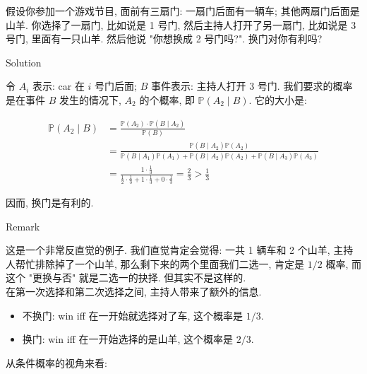 \documentclass{qlnotes-export}
\begin{document}
\begin{example}\label{ex-01-combinatorics-prob-space-monty-hall-problem}

假设你参加一个游戏节目, 面前有三扇门: 一扇门后面有一辆车; 其他两扇门后面是山羊. 你选择了一扇门, 比如说是 1 号门, 然后主持人打开了另一扇门, 比如说是 3 号门, 里面有一只山羊. 然后他说 "你想换成 2 号门吗?". 换门对你有利吗?

\begin{qlsolution}{Solution}

令 \(A_{i}\) 表示: car 在 \(i\) 号门后面; \(B\) 事件表示: 主持人打开 3 号门. 我们要求的概率是在事件 \(B\) 发生的情况下, \(A_{2}\) 的个概率, 即 \({\mathbb{P}}(A_{2} \mid B)\). 它的大小是:

\[\begin{matrix}
{{\mathbb{P}}(A_{2} \mid B)} & {= \frac{{\mathbb{P}}(A_{2}) \cdot {\mathbb{P}}(B \mid A_{2})}{{\mathbb{P}}(B)}} \\
 & {= \frac{{\mathbb{P}}(B \mid A_{2}){\mathbb{P}}(A_{2})}{{\mathbb{P}}(B \mid A_{1}){\mathbb{P}}(A_{1}) + {\mathbb{P}}(B \mid A_{2}){\mathbb{P}}(A_{2}) + {\mathbb{P}}(B \mid A_{3}){\mathbb{P}}(A_{3})}} \\
 & {= \frac{1 \cdot \frac{1}{3}}{\frac{1}{2} \cdot \frac{1}{3} + 1 \cdot \frac{1}{3} + 0 \cdot \frac{1}{3}} = \frac{2}{3} > \frac{1}{3}}
\end{matrix}\]

因而, 换门是有利的.

\end{qlsolution}

\begin{qlremark}{Remark}

这是一个非常反直觉的例子. 我们直觉肯定会觉得: 一共 1 辆车和 2 个山羊, 主持人帮忙排除掉了一个山羊, 那么剩下来的两个里面我们二选一, 肯定是 \(1/2\) 概率, 而这个 "更换与否" 就是二选一的抉择. 但其实不是这样的.\\
在第一次选择和第二次选择之间, 主持人带来了额外的信息.

\begin{itemize}
\item
  不换门: win iff 在一开始就选择对了车, 这个概率是 \(1/3\).
\item
  换门: win iff 在一开始选择的是山羊, 这个概率是 \(2/3\).
\end{itemize}

从条件概率的视角来看:


\end{qlremark}
\end{example}
\end{document}
